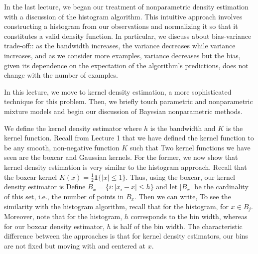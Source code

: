 \setcounter{section}{0}



In the last lecture, we began our treatment of nonparametric density estimation with a discussion of the histogram algorithm. This intuitive approach involves constructing a histogram from our observations and normalizing it so that it constitutes a valid density function. In particular, we discuss about bias-variance trade-off:: as the bandwidth increases, the variance decreases while variance increases, and as we consider more examples, variance decreases but the bias, given its dependence on the expectation of the algorithm's predictions, does not change with the number of examples. 

In this lecture, we move to kernel density estimation, a more sophisticated technique for this problem. Then, we briefly touch parametric and nonparametric mixture models and begin our discussion of Bayesian nonparametric methods. 


We define the kernel density estimator 
where $h$ is the bandwidth and $K$ is the kernel function. Recall from Lecture 1 that we have defined the kernel function to be any smooth, non-negative function $K$ such that
Two kernel functions we have seen are the boxcar and Gaussian kernels. For the former, we now show that kernel density estimation is very similar to the histogram approach. Recall that the boxcar kernel $K(x) = \frac{1}{2} \mathbf{1}\{|x| \leq 1\}$. Thus, using the boxcar, our kernel density estimator is 
Define $B_x = \{i : |x_i - x| \leq h \}$ and let $|B_x|$ be the cardinality of this set, i.e., the number of points in $B_x$. Then we can write, 
To see the similarity with the histogram algorithm, recall that for the histogram,
for $x \in B_j$. Moreover, note that for the histogram, $h$ corresponds to the bin width, whereas for our boxcar density estimator, $h$ is half of the bin width. The characteristic difference between the approaches is that for kernel density estimators, our bins are not fixed but moving with and centered at $x$. 

